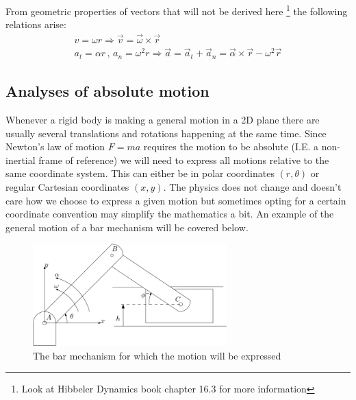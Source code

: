 \documentclass[11pt, a4paper]{article}
\begin{document}
From geometric properties of vectors that will not be derived here \footnote{Look at Hibbeler Dynamics book chapter 16.3 for more information}  the following relations arise:
\begin{gather}
    v = \omega r \Rightarrow \vec{v} = \vec{\omega} \times \vec{r}\\
    a_t = \alpha r \,,\, a_n = \omega^2 r \Rightarrow \vec{a} = \vec{a}_t + \vec{a}_n = \vec{\alpha} \times \vec{r} - \omega^2\vec{r}
\end{gather}

\subsection{Analyses of absolute motion}
Whenever a rigid body is making a general motion in a 2D plane there are usually several translations and rotations happening at the same time. Since Newton's law of motion $F =ma$ requires the motion to be absolute (I.E. a non-inertial frame of reference) we will need to express all motions relative to the same coordinate system. This can either be in polar coordinates $(r, \theta)$ or regular Cartesian coordinates $(x, y)$. The physics does not change and doesn't care how we choose to express a given motion but sometimes opting for a certain coordinate convention may simplify the mathematics a bit. An example of the general motion of a bar mechanism will be covered below.

\begin{figure}[h]
    \centerline{\includegraphics[width=75mm]{images/Bar_mechanism.png}}
    \caption{The bar mechanism for which the motion will be expressed}
\end{figure}
\end{document}

